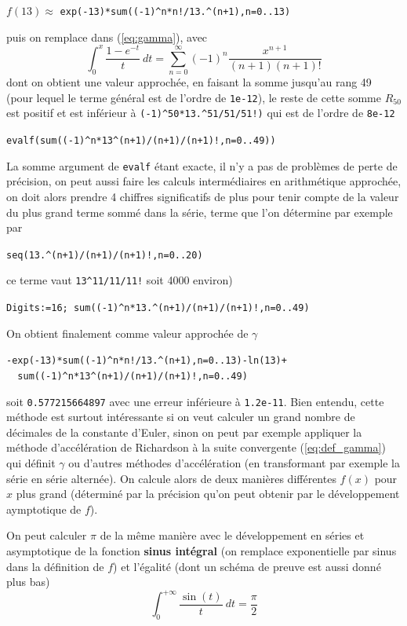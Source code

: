 \documentclass[a4paper,11pt]{article}
\begin{document}
\begin{giacjshere}
\begin{center}
$f(13) \approx$ \verb|exp(-13)*sum((-1)^n*n!/13.^(n+1),n=0..13)|
\end{center}
puis on remplace dans (\ref{eq:gamma}), avec 
\[ \int_0^{x} \frac{1-e^{-t}}{t} \ dt = 
\sum_{n=0}^{\infty} (-1)^n \frac{x^{n+1}}{(n+1) (n+1)!}\]
dont on obtient une valeur approch\'ee, 
en faisant la somme jusqu'au rang 49 (pour lequel
le terme g\'en\'eral est de l'ordre de \verb|1e-12|),
le reste de cette somme $R_{50}$ est positif et est inf\'erieur \`a
{\tt (-1)\verb|^|50*13.\verb|^|51/51/51!)} qui est de l'ordre de 
\verb|8e-12|
\begin{center}
\verb|evalf(sum((-1)^n*13^(n+1)/(n+1)/(n+1)!,n=0..49))|
\end{center}
La somme argument de \verb|evalf|
\'etant exacte, il n'y a pas de probl\`emes de perte de pr\'ecision,
on peut aussi faire les calculs interm\'ediaires en arithm\'etique approch\'ee,
on doit alors prendre 4 chiffres significatifs de plus
pour tenir compte de la valeur du plus grand terme
somm\'e dans la s\'erie, terme que l'on d\'etermine par exemple par
\begin{center}
{\tt seq(13.\verb|^|(n+1)/(n+1)/(n+1)!,n=0..20)}
\end{center} 
ce terme vaut \verb|13^11/11/11!| soit 4000 environ)
\begin{center}
\verb|Digits:=16; sum((-1)^n*13.^(n+1)/(n+1)/(n+1)!,n=0..49)|
\end{center}
On obtient finalement comme valeur approch\'ee de $\gamma$
\begin{center}
\verb|-exp(-13)*sum((-1)^n*n!/13.^(n+1),n=0..13)-ln(13)+|\\
\verb|  sum((-1)^n*13^(n+1)/(n+1)/(n+1)!,n=0..49)|
\end{center}
soit \verb|0.577215664897| avec une erreur inf\'erieure \`a \verb|1.2e-11|.
Bien entendu, cette m\'ethode est surtout int\'eressante si on veut calculer
un grand nombre de d\'ecimales de la constante d'Euler, sinon
on peut par exemple appliquer la m\'ethode d'acc\'el\'eration de Richardson \`a
la suite convergente (\ref{eq:def_gamma}) qui d\'efinit $\gamma$
ou d'autres m\'ethodes d'acc\'el\'eration (en transformant par
exemple la s\'erie en s\'erie altern\'ee). On calcule alors
de deux mani\`eres diff\'erentes $f(x)$ pour $x$ plus grand (d\'etermin\'e
par la pr\'ecision qu'on peut obtenir par le d\'eveloppement
aymptotique de $f$).

On peut calculer $\pi$ de la même manière avec le développement 
en séries et asymptotique
de la fonction {\bf sinus intégral} (on remplace exponentielle par sinus dans
la définition de $f$) et l'égalité (dont un sch\'ema de preuve est aussi
donn\'e plus bas)
\begin{equation} \label{eq:Siinf}
 \int_0^{+\infty} \frac{\sin(t)}{t} \ dt = \frac{\pi}{2}
\end{equation}


\end{giacjshere}
\end{document}
